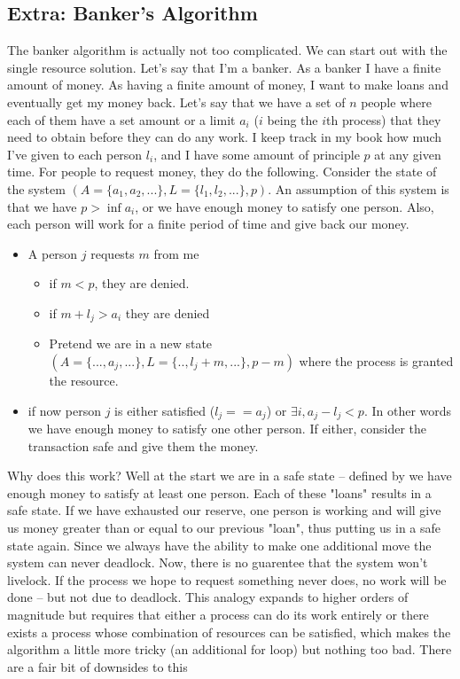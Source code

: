 \subsection{Extra: Banker's Algorithm}

The banker algorithm is actually not too complicated. We can start out with the single resource solution. Let's say that I'm a banker. As a banker I have a finite amount of money. As having a finite amount of money, I want to make loans and eventually get my money back. Let's say that we have a set of $n$ people where each of them have a set amount or a limit $a_i$ ($i$ being the $i$th process) that they need to obtain before they can do any work. I keep track in my book how much I've given to each person $l_i$, and I have some amount of principle $p$ at any given time. For people to request money, they do the following. Consider the state of the system $(A=\{a_1, a_2, ...\}, L=\{l_1, l_2, ...\}, p)$. An assumption of this system is that we have $p > \inf a_i$, or we have enough money to satisfy one person. Also, each person will work for a finite period of time and give back our money.

\begin{itemize}
\item A person $j$ requests $m$ from me
\begin{itemize}
\item if $m < p$, they are denied.
\item if $m + l_j > a_i$ they are denied
\item Pretend we are in a new state $(A=\{..., a_j, ...\}, L=\{.., l_j + m, ...\}, p - m)$ where the process is granted the resource.
\end{itemize}
\item if now person $j$ is either satisfied ($l_j == a_j$) or $\exists i, a_j - l_j < p$. In other words we have enough money to satisfy one other person. If either, consider the transaction safe and give them the money.
\end{itemize}

Why does this work? Well at the start we are in a safe state -- defined by we have enough money to satisfy at least one person. Each of these "loans" results in a safe state. If we have exhausted our reserve, one person is working and will give us money greater than or equal to our previous "loan", thus putting us in a safe state again. Since we always have the ability to make one additional move the system can never deadlock. Now, there is no guarentee that the system won't livelock. If the process we hope to request something never does, no work will be done -- but not due to deadlock. This analogy expands to higher orders of magnitude but requires that either a process can do its work entirely or there exists a process whose combination of resources can be satisfied, which makes the algorithm a little more tricky (an additional for loop) but nothing too bad. There are a fair bit of downsides to this

